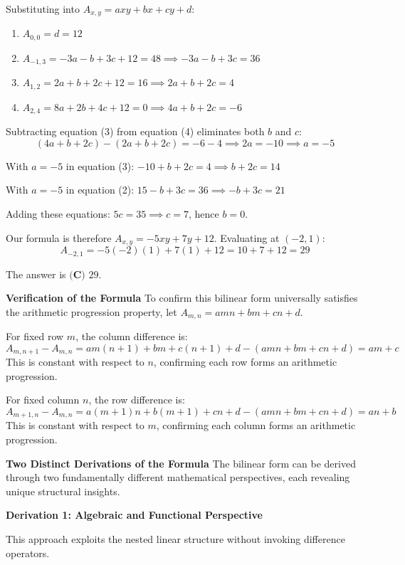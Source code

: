 \begin{enumerate}
 Substituting into $A_{x,y} = axy + bx + cy + d$:

 
            \begin{enumerate}
        \item $A_{0,0} = d = 12$
        \item $A_{-1,3} = -3a - b + 3c + 12 = 48 \implies -3a - b + 3c = 36$
        \item $A_{1,2} = 2a + b + 2c + 12 = 16 \implies 2a + b + 2c = 4$
        \item $A_{2,4} = 8a + 2b + 4c + 12 = 0 \implies 4a + b + 2c = -6$
            \end{enumerate}
            Subtracting equation (3) from equation (4) eliminates both $b$ and $c$:
 \[(4a + b + 2c) - (2a + b + 2c) = -6 - 4 \implies 2a = -10 \implies a = -5\]

 With $a = -5$ in equation (3): $-10 + b + 2c = 4 \implies b + 2c = 14$

 With $a = -5$ in equation (2): $15 - b + 3c = 36 \implies -b + 3c = 21$

 Adding these equations: $5c = 35 \implies c = 7$, hence $b = 0$.

 Our formula is therefore $A_{x,y} = -5xy + 7y + 12$. Evaluating at $(-2, 1)$:
 \[A_{-2,1} = -5(-2)(1) + 7(1) + 12 = 10 + 7 + 12 = 29\]

 The answer is $\boxed{\textbf{(C) } 29}$.

 \textbf{Verification of the Formula} To confirm this bilinear form universally satisfies the arithmetic progression property, let $A_{m,n} = amn + bm + cn + d$.

 For fixed row $m$, the column difference is:
 \[A_{m,n+1} - A_{m,n} = am(n+1) + bm + c(n+1) + d - (amn + bm + cn + d) = am + c\]This is constant with respect to $n$, confirming each row forms an arithmetic progression.

 For fixed column $n$, the row difference is:
 \[A_{m+1,n} - A_{m,n} = a(m+1)n + b(m+1) + cn + d - (amn + bm + cn + d) = an + b\]This is constant with respect to $m$, confirming each column forms an arithmetic progression.

 \textbf{Two Distinct Derivations of the Formula} The bilinear form can be derived through two fundamentally different mathematical perspectives, each revealing unique structural insights.

 \textbf{Derivation 1: Algebraic and Functional Perspective}

 This approach exploits the nested linear structure without invoking difference operators.


\end{enumerate}
